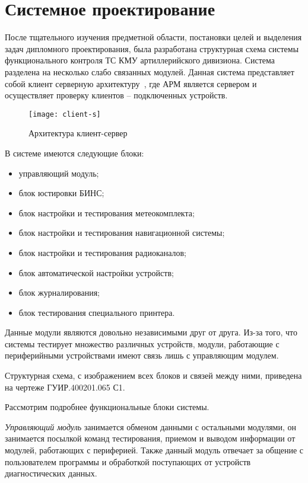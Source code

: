\section{Системное проектирование}
\label{sec:arch}

После тщательного изучения предметной области, постановки целей и выделения задач дипломного проектирования, была
разработана структурная схема системы функционального контроля ТС КМУ артиллерийского дивизиона.
Система разделена на несколько слабо связанных модулей.
Данная система представляет собой клиент серверную архитектуру~\cite{cl_s},
где АРМ является сервером и осуществляет проверку клиентов -- подключенных устройств.

\begin{figure}[ht]
	\centering
	\texttt{[image: client-s]}
	\caption{Архитектура клиент-сервер~\cite{cl_s}}
	\label{fig:sec_arch:client}
\end{figure}

В системе имеются следующие блоки:
\begin{itemize}
	\item управляющий модуль;
	\item блок юстировки БИНС;
	\item блок настройки и тестирования метеокомплекта;
	\item блок настройки и тестирования навигационной системы;
	\item блок настройки и тестирования радиоканалов;
	\item блок автоматической настройки устройств;
	\item блок журналирования;
	\item блок тестирования специального принтера.
\end{itemize}

Данные модули являются довольно независимыми друг от друга. Из-за того, что системы тестирует множество различных
устройств, модули, работающие с периферийными устройствами имеют связь лишь с управляющим модулем.

Структурная схема, с изображением всех блоков и связей между ними, приведена на чертеже ГУИР.400201.065 С1.

Рассмотрим подробнее функциональные блоки системы.

\textit{Управляющий модуль} занимается обменом данными с остальными модулями, он занимается посылкой команд
тестирования, приемом и выводом информации от модулей, работающих с периферией. Также данный модуль отвечает за общение
с пользователем программы и обработкой поступающих от устройств диагностических данных.

